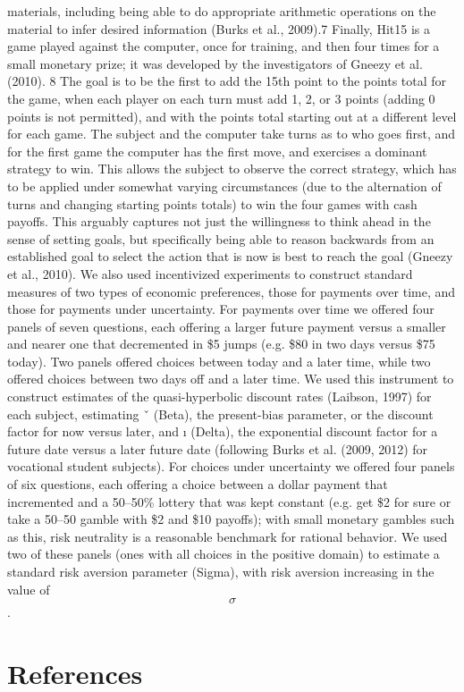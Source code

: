 \documentclass[12pt,a4paper]{article}
\begin{document}
materials, including being able to do appropriate arithmetic operations on the material to infer desired information (Burks
et al., 2009).7
Finally, Hit15 is a game played against the computer, once for training, and then four times for a small monetary prize; it
was developed by the investigators of Gneezy et al. (2010).
8 The goal is to be the first to add the 15th point to the points total
for the game, when each player on each turn must add 1, 2, or 3 points (adding 0 points is not permitted), and with the points
total starting out at a different level for each game. The subject and the computer take turns as to who goes first, and for
the first game the computer has the first move, and exercises a dominant strategy to win. This allows the subject to observe
the correct strategy, which has to be applied under somewhat varying circumstances (due to the alternation of turns and
changing starting points totals) to win the four games with cash payoffs. This arguably captures not just the willingness to
think ahead in the sense of setting goals, but specifically being able to reason backwards from an established goal to select
the action that is now is best to reach the goal (Gneezy et al., 2010).
We also used incentivized experiments to construct standard measures of two types of economic preferences, those for payments over time, and those for payments under uncertainty. For payments over time we offered four panels of seven questions, each offering a larger future payment versus a smaller and nearer one that decremented in \$5 jumps (e.g. \$80 in two days versus \$75 today). Two panels offered choices between today and a later time, while two offered choices between two days off and a later time. We used this instrument to construct estimates of the quasi-hyperbolic discount rates (Laibson, 1997) for each subject, estimating ˇ (Beta), the present-bias parameter, or the discount factor for now versus later, and ı (Delta), the exponential discount factor for a future date versus a later future date (following Burks et al. (2009, 2012) for vocational student subjects). For choices under uncertainty we offered four panels of six questions, each offering a choice between a dollar payment that incremented and a 50–50\% lottery that was kept constant (e.g. get \$2 for sure or take a 50–50 gamble with \$2 and \$10 payoffs); with small monetary gambles such as this,
risk neutrality is a reasonable benchmark for rational behavior. We used two of these panels (ones with all choices in the positive domain) to estimate a standard risk aversion parameter (Sigma), with risk aversion increasing in the value
of \[\sigma\]. 

\section{References}


\end{document}
